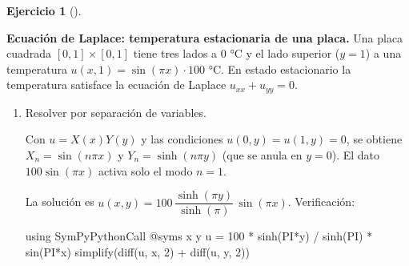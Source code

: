 \documentclass[
  spanish,
  a4paper,
]{scrreport}
\newenvironment{Shaded}{\begin{snugshade}}{\end{snugshade}}
\newcommand{\BuiltInTok}[1]{\textcolor[rgb]{0.00,0.23,0.31}{#1}}
\newcommand{\FloatTok}[1]{\textcolor[rgb]{0.68,0.00,0.00}{#1}}
\newcommand{\FunctionTok}[1]{\textcolor[rgb]{0.28,0.35,0.67}{#1}}
\newcommand{\ImportTok}[1]{\textcolor[rgb]{0.00,0.46,0.62}{#1}}
\newcommand{\NormalTok}[1]{\textcolor[rgb]{0.00,0.23,0.31}{#1}}
\newcommand{\OperatorTok}[1]{\textcolor[rgb]{0.37,0.37,0.37}{#1}}
\newcommand{\PreprocessorTok}[1]{\textcolor[rgb]{0.68,0.00,0.00}{#1}}
\theoremstyle{definition}
\newtheorem{exercise}{Ejercicio}[chapter]
\theoremstyle{remark}
\begin{document}
\begin{exercise}[]\protect\hypertarget{exr-laplace-placa}{}\label{exr-laplace-placa}

\textbf{Ecuación de Laplace: temperatura estacionaria de una placa.} Una
placa cuadrada \([0,1]\times[0,1]\) tiene tres lados a \(0\) °C y el
lado superior (\(y = 1\)) a una temperatura
\(u(x, 1) = \sin(\pi x)\cdot 100\) °C. En estado estacionario la
temperatura satisface la ecuación de Laplace \(u_{xx} + u_{yy} = 0\).

\begin{enumerate}
\def\labelenumi{\alph{enumi}.}
\item
  Resolver por separación de variables.

  \begin{tcolorbox}[enhanced jigsaw, arc=.35mm, bottomrule=.15mm, bottomtitle=1mm, breakable, colback=white, colbacktitle=quarto-callout-note-color!10!white, colframe=quarto-callout-note-color-frame, coltitle=black, left=2mm, leftrule=.75mm, opacityback=0, opacitybacktitle=0.6, rightrule=.15mm, title=\textcolor{quarto-callout-note-color}{\faInfo}\hspace{0.5em}{Ayuda}, titlerule=0mm, toprule=.15mm, toptitle=1mm]

  Con \(u = X(x)Y(y)\) y las condiciones \(u(0,y)=u(1,y)=0\), se obtiene
  \(X_n = \sin(n\pi x)\) y \(Y_n = \sinh(n\pi y)\) (que se anula en
  \(y=0\)). El dato \(100\sin(\pi x)\) activa solo el modo \(n=1\).

  \end{tcolorbox}

  \begin{tcolorbox}[enhanced jigsaw, arc=.35mm, bottomrule=.15mm, bottomtitle=1mm, breakable, colback=white, colbacktitle=quarto-callout-tip-color!10!white, colframe=quarto-callout-tip-color-frame, coltitle=black, left=2mm, leftrule=.75mm, opacityback=0, opacitybacktitle=0.6, rightrule=.15mm, title=\textcolor{quarto-callout-tip-color}{\faLightbulb}\hspace{0.5em}{Solución}, titlerule=0mm, toprule=.15mm, toptitle=1mm]

  La solución es
  \(u(x, y) = 100\,\dfrac{\sinh(\pi y)}{\sinh(\pi)}\,\sin(\pi x)\).
  Verificación:

\begin{Shaded}
\begin{Highlighting}[]
\ImportTok{using} \BuiltInTok{SymPyPythonCall}
\PreprocessorTok{@syms}\NormalTok{ x y}
\NormalTok{u }\OperatorTok{=} \FloatTok{100} \OperatorTok{*} \FunctionTok{sinh}\NormalTok{(PI}\OperatorTok{*}\NormalTok{y) }\OperatorTok{/} \FunctionTok{sinh}\NormalTok{(PI) }\OperatorTok{*} \FunctionTok{sin}\NormalTok{(PI}\OperatorTok{*}\NormalTok{x)}
\FunctionTok{simplify}\NormalTok{(}\FunctionTok{diff}\NormalTok{(u, x, }\FloatTok{2}\NormalTok{) }\OperatorTok{+} \FunctionTok{diff}\NormalTok{(u, y, }\FloatTok{2}\NormalTok{))}
\end{Highlighting}
\end{Shaded}


\end{tcolorbox}
\end{enumerate}
\end{exercise}
\end{document}
